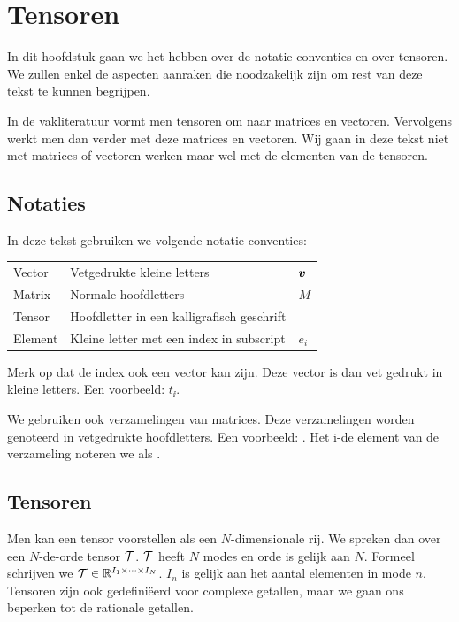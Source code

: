 \chapter{Tensoren}
\label{h:tensoren}
In dit hoofdstuk gaan we het hebben over de notatie-conventies en over tensoren. We zullen enkel de aspecten aanraken die noodzakelijk zijn om rest van deze tekst te kunnen begrijpen.

In de vakliteratuur vormt men tensoren om naar matrices en vectoren. Vervolgens werkt men dan verder met deze matrices en vectoren. Wij gaan in deze tekst niet met matrices of vectoren werken maar wel met de elementen van de tensoren. 


\section{Notaties}
In deze tekst gebruiken we volgende notatie-conventies:

\begin{tabular}{l l l}
    Vector						& Vetgedrukte kleine letters					& $\boldsymbol{v}$\\
    Matrix 						& Normale hoofdletters							& $M$\\
    Tensor 						& Hoofdletter in een kalligrafisch geschrift	& \TT\\
    Element						& Kleine letter met een index in subscript		& $e_i$\\
\end{tabular}

Merk op dat de index ook een vector kan zijn. Deze vector is dan vet gedrukt in kleine letters. Een voorbeeld: $t_{\ii}$.

We gebruiken ook verzamelingen van matrices. Deze verzamelingen worden genoteerd in vetgedrukte hoofdletters. Een voorbeeld: \UUU{}. Het i-de element van de verzameling \UUU{} noteren we als .

\section{Tensoren}
Men kan een tensor voorstellen als een $N$-dimensionale rij. We spreken dan over een $N$-de-orde tensor $\mathcal{T}$. $\mathcal{T}$ heeft $N$ modes en orde is gelijk aan $N$. Formeel schrijven we $\mathcal{T} \in \mathbb{R}^{I_1 \times \dotsb \times I_N}$. $I_n$ is gelijk aan het aantal elementen in mode $n$. Tensoren zijn ook gedefini\"eerd voor complexe getallen, maar we gaan ons beperken tot de rationale getallen.

